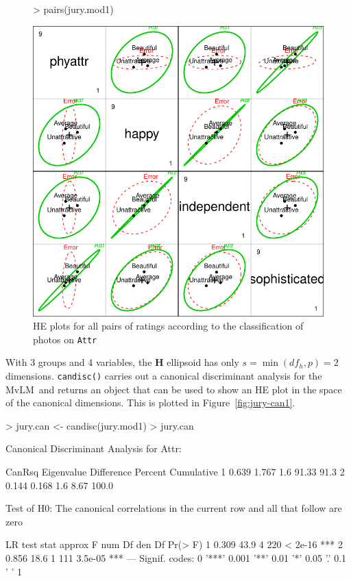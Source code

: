 \documentclass[11pt]{article}
\newcommand{\mat}[1]{\ensuremath{\bm{#1}}}
\newcommand*{\MLM}{MvLM\xspace}
\newcommand{\figref}[1]{Figure~\ref{#1}}
\newcommand{\code}[1]{{\texttt{#1}}}
\newcommand{\func}[1]{{\texttt{#1()}}}
\begin{document}
\begin{figure}[htb]
\begin{center}
\begin{Schunk}
\begin{Sinput}
> pairs(jury.mod1)
\end{Sinput}
\end{Schunk}
\includegraphics{fig/plot-jury-mod1-pairs}
\caption{HE plots for all pairs of ratings according to the
	classification of photos on \code{Attr}}
\label{fig:jury-mod1-pairs}
\end{center}
\end{figure}

With 3 groups and 4 variables, the \mat{H} ellipsoid has only $s=\min(df_h, p)=2$
dimensions.  \func{candisc} carries out a canonical discriminant analysis
for the \MLM\  and returns an object that can be used to show an HE plot in the
space of the canonical dimensions.  This is plotted in \figref{fig:jury-can1}.

\begin{Schunk}
\begin{Sinput}
> jury.can <- candisc(jury.mod1)
> jury.can
\end{Sinput}
\begin{Soutput}
Canonical Discriminant Analysis for Attr:

  CanRsq Eigenvalue Difference Percent Cumulative
1  0.639      1.767        1.6   91.33       91.3
2  0.144      0.168        1.6    8.67      100.0

Test of H0: The canonical correlations in the 
current row and all that follow are zero

  LR test stat approx F num Df den Df Pr(> F)    
1        0.309     43.9      4    220 < 2e-16 ***
2        0.856     18.6      1    111 3.5e-05 ***
---
Signif. codes:  0 '***' 0.001 '**' 0.01 '*' 0.05 '.' 0.1 ' ' 1 
\end{Soutput}
\end{Schunk}
\end{document}
